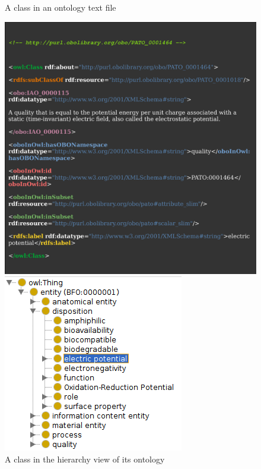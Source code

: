 \documentclass[english, xcolor=dvipsnames, aspectratio=169]{beamer}
\newcommand{\subsectiontitle}{}
\begin{document}
\begin{frame}{\subsectiontitle}
    \begin{figure}[ht]
        \begin{minipage}[b]{0.35\linewidth}
            \centering
             \caption{A class in an ontology text file}
            \includegraphics[width=\textwidth]{owltext.pdf}
           
        \end{minipage}
        \hspace{0.5cm}
        \begin{minipage}[b]{0.35\linewidth}
            \centering
            \caption{A class in the hierarchy view of its ontology}
            \includegraphics[width=\textwidth]{classhierarchy.png}
            

\end{minipage}
\end{figure}
\end{frame}
\end{document}

